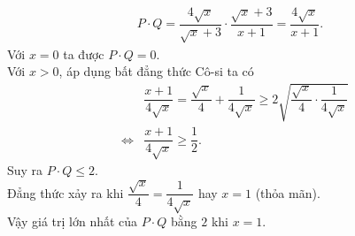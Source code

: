 \begin{bt}
{\begin{enumerate}
			\begin{eqnarray*}
				P \cdot Q = \dfrac{4\sqrt{x}}{\sqrt{x}+3} \cdot \dfrac{\sqrt{x}+3}{x+1} = \dfrac{4\sqrt{x}}{x+1}.
			\end{eqnarray*}
			Với $x=0$ ta được $P \cdot Q = 0$.\\
			Với $x>0$, áp dụng bất đẳng thức Cô-si ta có
			\allowdisplaybreaks
			\begin{eqnarray*}
				&& \dfrac{x+1}{4\sqrt{x}} = \dfrac{\sqrt{x}}{4} + \dfrac{1}{4\sqrt{x}} \geq 2\sqrt{\dfrac{\sqrt{x}}{4} \cdot \dfrac{1}{4\sqrt{x}}}\\
				&\Leftrightarrow & \dfrac{x+1}{4\sqrt{x}} \geq \dfrac{1}{2}.
			\end{eqnarray*}
			Suy ra $P \cdot Q \leq 2$.\\
			Đẳng thức xảy ra khi $\dfrac{\sqrt{x}}{4} = \dfrac{1}{4\sqrt{x}}$ hay $x=1$ (thỏa mãn).\\
			Vậy giá trị lớn nhất của $P \cdot Q$ bằng $2$ khi $x=1$.
		\end{enumerate}
	}
\end{bt}

